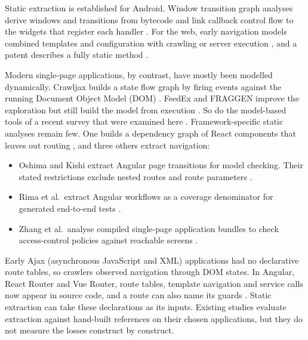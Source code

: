 Static extraction is established for Android. Window transition graph analyses derive windows and
transitions from bytecode and link callback control flow to the widgets that register each handler
\cite{yang2015wtg,yang2015callbacks,yang2018wtg}. For the web, early navigation models combined
templates and configuration with crawling or server execution \cite{riccatonella2001,webuml2004},
and a patent describes a fully static method \cite{tkachuk2013patent}.

Modern single-page applications, by contrast, have mostly been modelled dynamically. Crawljax
builds a state flow graph by firing events against the running Document Object Model (DOM)
\cite{crawljax2012}. FeedEx and FRAGGEN improve the exploration but still build the model from
execution \cite{feedex2013,fraggen2022}. So do the model-based tools of a recent survey that were
examined here \cite{websurvey2025}. Framework-specific static analyses remain few. One builds a
dependency graph of React components that leaves out routing \cite{kurant2025}, and three others
extract navigation:
\begin{itemize}
\item Oshima and Kishi extract Angular page transitions for model checking. Their stated
restrictions exclude nested routes and route parameters \cite{oshima2018model}.
\item Rima et al.\ extract Angular workflows as a coverage denominator for generated end-to-end
tests \cite{rima2026e2e}.
\item Zhang et al.\ analyse compiled single-page application bundles to check access-control
policies against reachable screens \cite{zhang2025veriflow}.
\end{itemize}

Early Ajax (asynchronous JavaScript and XML) applications had no declarative route tables, so crawlers observed navigation through
DOM states. In Angular, React Router and Vue Router, route tables, template navigation and service
calls now appear in source code, and a route can also name its guards \cite{angulardocs}. Static
extraction can take these declarations as its inputs. Existing studies evaluate extraction against
hand-built references on their chosen applications, but they do not measure the losses construct
by construct.

